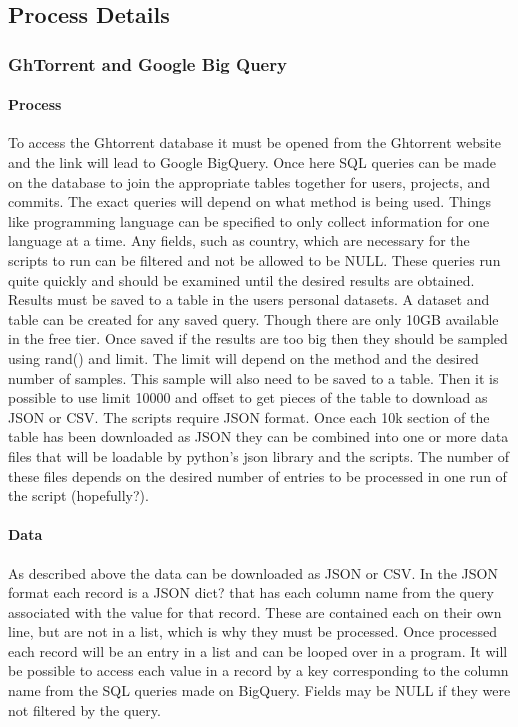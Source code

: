 \documentclass{article}
\begin{document}
\subsection{Process Details}

\subsubsection{GhTorrent and Google Big Query}

\paragraph{Process}
To access the Ghtorrent database it must be opened from the Ghtorrent website and the link will lead to Google BigQuery. Once here SQL queries can be made on the database to join the appropriate tables together for users, projects, and commits. The exact queries will depend on what method is being used. Things like programming language can be specified to only collect information for one language at a time. Any fields, such as country, which are necessary for the scripts to run can be filtered and not be allowed to be NULL. These queries run quite quickly and should be examined until the desired results are obtained. Results must be saved to a table in the users personal datasets. A dataset and table can be created for any saved query. Though there are only 10GB available in the free tier. Once saved if the results are too big then they should be sampled using rand() and limit. The limit will depend on the method and the desired number of samples. This sample will also need to be saved to a table. Then it is possible to use limit 10000 and offset to get pieces of the table to download as JSON or CSV. The scripts require JSON format. Once each 10k section of the table has been downloaded as JSON they can be combined into one or more data files that will be loadable by python's json library and the scripts. The number of these files depends on the desired number of entries to be processed in one run of the script (hopefully?).

\paragraph{Data}
As described above the data can be downloaded as JSON or CSV. In the JSON format each record is a JSON dict? that has each column name from the query associated with the value for that record. These are contained each on their own line, but are not in a list, which is why they must be processed. Once processed each record will be an entry in a list and can be looped over in a program. It will be possible to access each value in a record by a key corresponding to the column name from the SQL queries made on BigQuery. Fields may be NULL if they were not filtered by the query.
\end{document}
